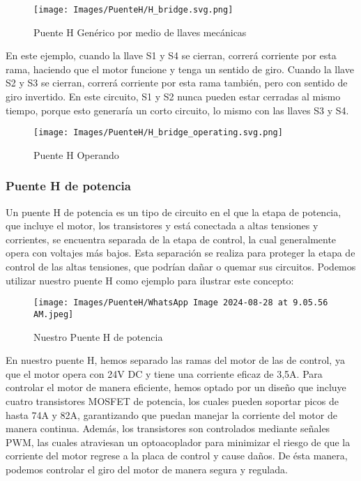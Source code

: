 \documentclass{article}
\begin{document}
\begin{figure}[H]
    \centering
    \texttt{[image: Images/PuenteH/H\_bridge.svg.png]}
    \caption{Puente H Genérico por medio de llaves mecánicas}
\end{figure}

En este ejemplo, cuando la llave S1 y S4 se cierran, correrá corriente por esta rama, haciendo que el motor funcione y tenga un sentido de giro. Cuando la llave S2 y S3 se cierran, correrá corriente por esta rama también, pero con sentido de giro invertido. En este circuito, S1 y S2 nunca pueden estar cerradas al mismo tiempo, porque esto generaría un corto circuito, lo mismo con las llaves S3 y S4.

\begin{figure}[H]
    \centering
    \texttt{[image: Images/PuenteH/H\_bridge\_operating.svg.png]}
    \caption{Puente H Operando}
\end{figure}

\subsubsection{Puente H de potencia}
Un puente H de potencia es un tipo de circuito en el que la etapa de potencia, que incluye el motor, los transistores y está conectada a altas tensiones y corrientes, se encuentra separada de la etapa de control, la cual generalmente opera con voltajes más bajos. Esta separación se realiza para proteger la etapa de control de las altas tensiones, que podrían dañar o quemar sus circuitos. Podemos utilizar nuestro puente H como ejemplo para ilustrar este concepto:

 \begin{figure}[H]
     \centering
     \texttt{[image: Images/PuenteH/WhatsApp Image 2024-08-28 at 9.05.56 AM.jpeg]}
     \caption{Nuestro Puente H de potencia}
     \label{fig:enter-label}
 \end{figure}

En nuestro puente H, hemos separado las ramas del motor de las de control, ya que el motor opera con 24V DC y tiene una corriente eficaz de 3,5A. Para controlar el motor de manera eficiente, hemos optado por un diseño que incluye cuatro transistores MOSFET de potencia, los cuales pueden soportar picos de hasta 74A y 82A, garantizando que puedan manejar la corriente del motor de manera continua. Además, los transistores son controlados mediante señales PWM, las cuales atraviesan un optoacoplador para minimizar el riesgo de que la corriente del motor regrese a la placa de control y cause daños. De ésta manera, podemos controlar el giro del motor de manera segura y regulada.
\end{document}
